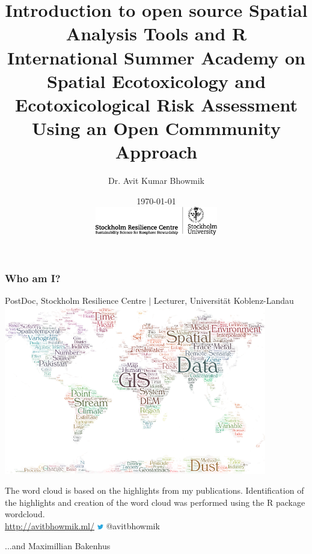 \documentclass{beamer}
\title[Open SouRce. Summer Academy `16]{Introduction to open source Spatial Analysis Tools and R\\
\medskip \tiny{International Summer Academy on Spatial Ecotoxicology and Ecotoxicological Risk Assessment\\Using an Open Commmunity Approach}} %
\author[Avit Bhowmik]{Dr. Avit Kumar Bhowmik \\} %
\institute[SRC] %
{
\textit{avit.bhowmik@su.se}%
}
\date[\today]{\today \\[0.5cm]
\includegraphics[width=0.4\textwidth]{Figures/SRC_logo.png}} %
\begin{document}
\begin{frame}
\titlepage %
\end{frame}


\begin{frame}
\frametitle{Who am I?}
\centering
\small{PostDoc, Stockholm Resilience Centre $|$ Lecturer, Universität Koblenz-Landau} \\[0.1cm]
\includegraphics[width=0.86\textwidth]{Figures/WC_pub.png}\\
\raggedright
\tiny{The word cloud is based on the highlights from my publications. Identification of the highlights and creation of the word cloud was performed using the R package wordcloud.} \\[0.08cm]
\scriptsize{\url{http://avitbhowmik.ml/}} \hspace{1cm} \includegraphics[width=0.02\textwidth]{Figures/twit.jpg} @avitbhowmik
\end{frame}



\begin{frame}
\centering
\Huge ...and Maximillian Bakenhus
\end{frame}

\end{document}
